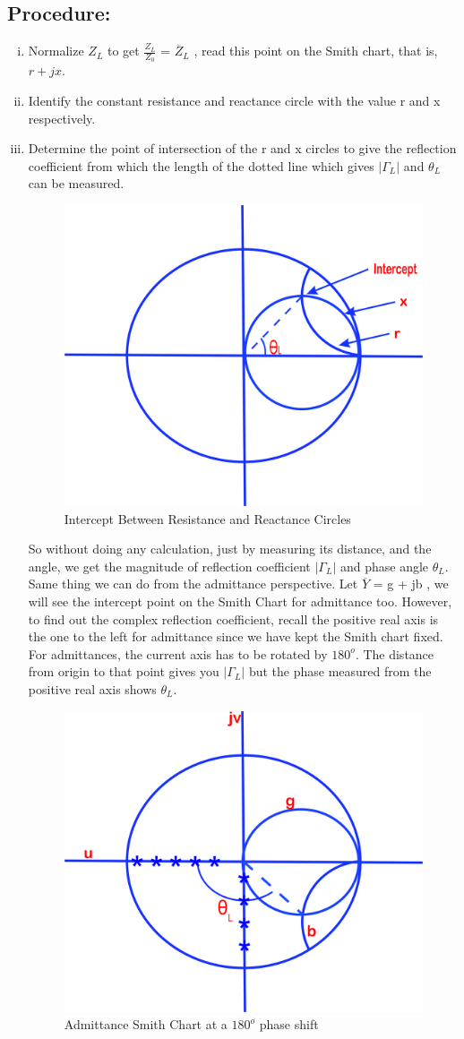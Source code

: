 \subsection*{Procedure:}
\begin{enumerate}[(i)]
\item Normalize $Z_{L}$ to get $\frac{Z_{L}}{Z_{0}}$ = $\overline{Z}_{L}$ , read this point on the Smith chart, that is,  $r+jx$.
\item Identify the constant resistance and reactance circle with the value r and x respectively.
\item Determine the point of intersection of the r and x circles to give the reflection coefficient from which the length of the dotted line which gives $|\Gamma_L|$ and $\theta_L$ can be measured.
\begin{figure}[h]
\centering
\includegraphics[width=0.6\linewidth]{./graphics/lfds}
\caption{Intercept Between Resistance and Reactance Circles}
\label{fig:lfds}
\end{figure}

So without doing any calculation, just by measuring its distance, and the angle, we get the magnitude of reflection coefficient   $|\Gamma_L|$
and phase angle $\theta_L$. Same thing we can do from the admittance perspective. Let $\overline{Y}$ = g + jb , we will see the intercept point on the Smith Chart for admittance too. However, to find out the complex reflection coefficient, recall the positive real axis is the one to the left for admittance since we have kept the Smith chart fixed. For admittances, the current axis has to be rotated by $180^o$. The distance from origin to that point gives you  $|\Gamma_L|$ but the phase measured from the  positive real axis shows $\theta_L$. 
\begin{figure}[h]
\centering
\includegraphics[width=0.6\linewidth]{./graphics/KJHGFDS}
\caption{Admittance Smith Chart at a $180^o$ phase shift}
\label{fig:kjhgfds}
\end{figure}
 

\end{enumerate}

